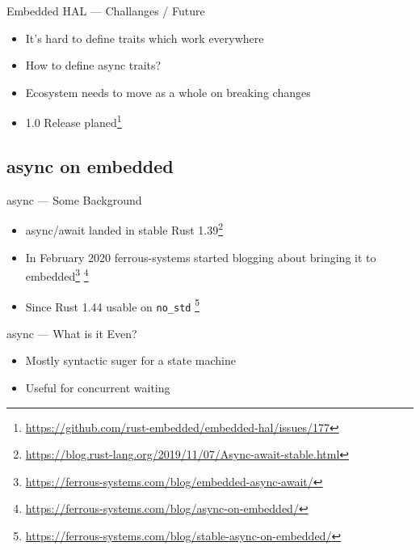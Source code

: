 \documentclass[aspectratio=1610,14pt,t]{beamer}
\begin{document}
\begin{frame}[c]{Embedded HAL --- Challanges / Future}
  \begin{itemize}
  \item It's hard to define traits which work everywhere

  \item How to define async traits?
  \item Ecosystem needs to move as a whole on breaking changes
  \item 1.0 Release planed\footnote{\url{https://github.com/rust-embedded/embedded-hal/issues/177}}
  \end{itemize}
\end{frame}

\subsection{async on embedded}
\begin{frame}[c]{async --- Some Background}
  \begin{itemize}
    \item async/await landed in stable Rust 1.39\footnote{\url{https://blog.rust-lang.org/2019/11/07/Async-await-stable.html}}
    \item In February 2020 ferrous-systems started blogging about bringing it
      to embedded\footnote{\url{https://ferrous-systems.com/blog/embedded-async-await/}}
      \footnote{\url{https://ferrous-systems.com/blog/async-on-embedded/}}
    \item Since Rust 1.44 usable on \texttt{no\_std}
      \footnote{\url{https://ferrous-systems.com/blog/stable-async-on-embedded/}}
  \end{itemize}
\end{frame}

\begin{frame}[c]{async --- What is it Even?}
  \begin{itemize}
    \item Mostly syntactic suger for a state machine
    \item Useful for concurrent waiting
  \end{itemize}
\end{frame}
\end{document}
